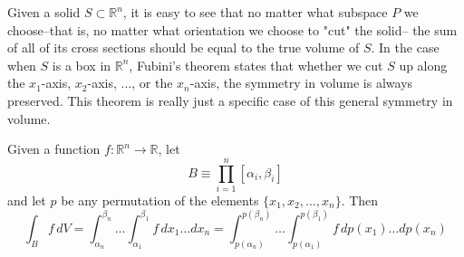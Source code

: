  Given a solid $S \subset \mathbb{R}^n$, it is easy to see that no matter what subspace $P$ we choose–that is, no matter what orientation we choose to "cut" the solid– the sum of all of its cross sections should be equal to the true volume of $S$. In the case when $S$ is a box in $\mathbb{R}^n$, Fubini's theorem states that whether we cut $S$ up along the $x_1$-axis, $x_2$-axis, ..., or the $x_n$-axis, the symmetry in volume is always preserved. This theorem is really just a specific case of this general symmetry in volume. 

  \begin{theorem}
    Given a function $f: \mathbb{R}^n \longrightarrow \mathbb{R}$, let 
    \[B \equiv \prod_{i=1}^n [\alpha_i, \beta_i]\]
    and let 
    $p$ be any permutation of the elements $\{x_1, x_2, \ldots, x_n\}$. Then 
    \begin{equation}
        \int_B f \, d V = \int_{\alpha_n}^{\beta_n} \ldots \int_{\alpha_1}^{\beta_1} f \, d x_1 \ldots d x_n = \int_{p(\alpha_n)}^{p(\beta_n)} \ldots \int_{p(\alpha_1)}^{p(\beta_1)} f \, d p(x_1) \ldots d p(x_n) 
    \end{equation}
  \end{theorem}

